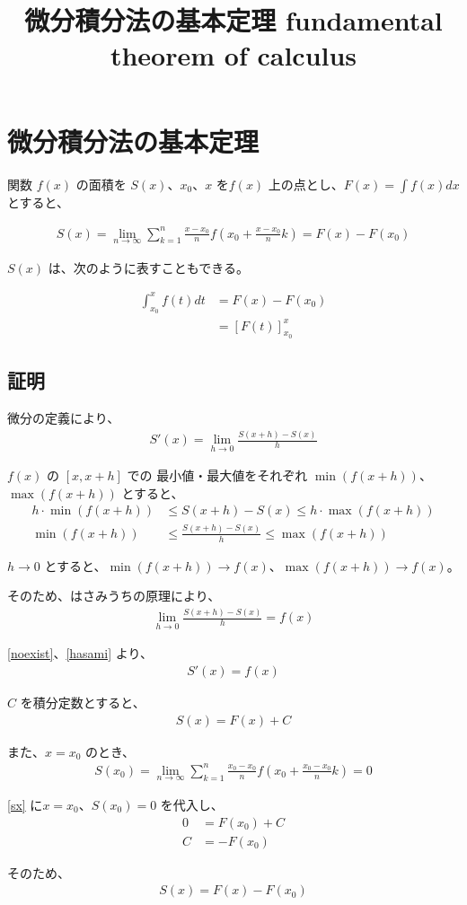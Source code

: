 \documentclass[fleqn]{jsarticle}
\begin{document}
\title{微分積分法の基本定理 fundamental theorem of calculus}
\author{}
\date{}

\section*{微分積分法の基本定理}

関数 $f(x)$ の面積を $S(x)$、$x_0$、$x$ を$f(x)$ 上の点とし、$F(x) = \int f(x) dx$ とすると、

\begin{align*}
  S(x) = \lim_{n \to \infty} \sum^{n}_{k=1} \frac{x - x_0}{n} f(x_0 + \frac{x-x_0}{n} k) = F(x) - F(x_0)
\end{align*}

$S(x)$ は、次のように表すこともできる。

\begin{align*}
  \int^{x}_{x_0} f(t) dt &= F(x) - F(x_0) \\
  &= [F(t)]^x_{x_0}
\end{align*}

\subsection*{証明}
微分の定義により、
\begin{align}
  S'(x) = \lim_{h \to 0} \frac{S(x+h) - S(x)}{h}
  \label{df}
\end{align}

$f(x)$ の $[x, x+h]$ での 最小値・最大値をそれぞれ $\min(f(x+h))$、$\max(f(x+h))$ とすると、
\begin{align*}
  h \cdot \min(f(x+h)) &\leq S(x+h) - S(x) \leq h \cdot \max(f(x+h)) \\
  \min(f(x+h)) &\leq \frac{S(x+h) - S(x)}{h} \leq \max(f(x+h))
\end{align*}

$h \to 0$ とすると、$\min(f(x+h)) \to f(x)$、$\max(f(x+h)) \to f(x)$。

そのため、はさみうちの原理により、
\begin{align}
  \lim_{h \to 0} \frac{S(x+h) - S(x)}{h} = f(x)
  \label{hasami}
\end{align}


\ref{noexist}、\ref{hasami} より、
\begin{align*}
  S'(x) = f(x)
\end{align*}

$C$ を積分定数とすると、
\begin{align}
  S(x) = F(x) + C
  \label{sx}
\end{align}

また、$x = x_0$ のとき、
\begin{align*}
  S(x_0) = \lim_{n \to \infty} \sum^{n}_{k=1} \frac{x_0 - x_0}{n} f(x_0 + \frac{x_0-x_0}{n} k) = 0
\end{align*}

\ref{sx} に$x = x_0$、$S(x_0) = 0$ を代入し、
\begin{align*}
  0 &= F(x_0) + C \\
  C &= -F(x_0)
\end{align*}

そのため、
\begin{align*}
  S(x) = F(x) - F(x_0)
\end{align*}
\end{document}

